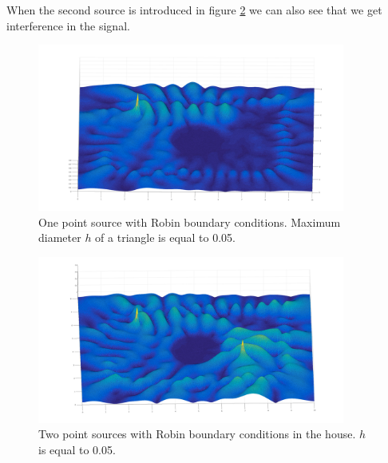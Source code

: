 \documentclass[10pt,a4paper]{article}
\begin{document}
When the second source is introduced in figure \ref{fig:house2sources} we can also see that we get interference in the signal.

\begin{figure}[H]
\centering
    \includegraphics[width=0.9\textwidth]{figures/house_topleft_source.pdf}
	\caption{One point source with Robin boundary conditions. Maximum diameter $h$ of a triangle is equal to 0.05. }
  \label{fig:house1source}
\end{figure}

\begin{figure}[H]
\centering
    \includegraphics[width=0.9\textwidth]{figures/house_doublesource.pdf}
	\caption{Two point sources with Robin boundary conditions in the house. $h$ is equal to 0.05.}
  \label{fig:house2sources}
\end{figure}
\end{document}
